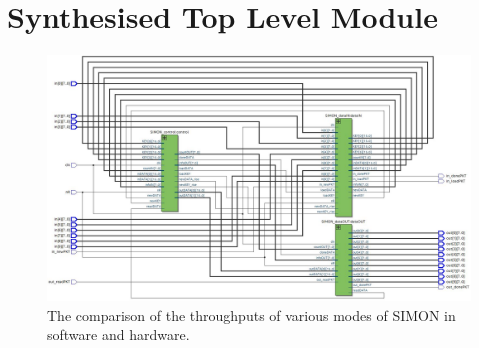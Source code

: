 \documentclass[12pt,twoside,a4paper]{report}
\begin{document}
	
	

	\appendix
	
	
	
	\chapter{Synthesised Top Level Module}

	\begin{figure}[H]
		\includegraphics[width=\textwidth]{SIMON_synth}
		\centering
		\caption{The comparison of the throughputs of various modes of SIMON in software and hardware.}
		\label{fig:synth_final}
	\end{figure}
\end{document}
